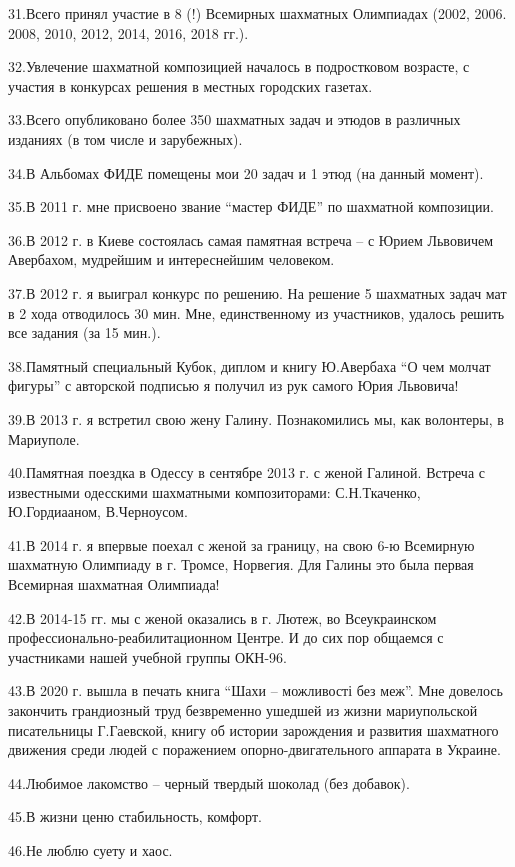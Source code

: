 31.Всего принял участие в 8 (!) Всемирных шахматных Олимпиадах (2002, 2006.
2008, 2010, 2012, 2014, 2016, 2018 гг.).

32.Увлечение шахматной композицией началось в подростковом возрасте, с участия
в конкурсах решения в местных городских газетах. 

33.Всего опубликовано более 350 шахматных задач и этюдов в различных изданиях
(в том числе и зарубежных).

34.В Альбомах ФИДЕ помещены мои 20 задач и 1 этюд (на данный момент). 

35.В 2011 г. мне присвоено звание \enquote{мастер ФИДЕ} по шахматной композиции. 

36.В 2012 г. в Киеве состоялась самая памятная встреча – с Юрием Львовичем
Авербахом, мудрейшим и интереснейшим человеком.

37.В 2012 г. я выиграл конкурс по решению. На решение 5 шахматных задач мат в 2
хода отводилось 30 мин. Мне, единственному из участников, удалось решить все
задания (за 15 мин.).

38.Памятный специальный Кубок, диплом и книгу Ю.Авербаха \enquote{О чем молчат фигуры}
с авторской подписью я получил из рук самого Юрия Львовича! 

39.В 2013 г. я встретил свою жену Галину. Познакомились мы, как волонтеры, в
Мариуполе. 

40.Памятная поездка в Одессу в сентябре 2013 г. с женой Галиной. Встреча с
известными одесскими шахматными композиторами: С.Н.Ткаченко, Ю.Гордиааном,
В.Черноусом. 

41.В 2014 г. я впервые поехал с женой за границу, на свою 6-ю Всемирную
шахматную Олимпиаду в г. Тромсе, Норвегия. Для Галины это была первая Всемирная
шахматная Олимпиада! 

42.В 2014-15 гг. мы с женой оказались в г. Лютеж, во Всеукраинском
профессионально-реабилитационном Центре. И до сих пор общаемся с участниками
нашей учебной группы ОКН-96. 

43.В 2020 г. вышла в печать книга \enquote{Шахи – можливості без меж}. Мне довелось
закончить грандиозный труд безвременно ушедшей из жизни мариупольской
писательницы Г.Гаевской, книгу об истории зарождения и развития шахматного
движения среди людей с поражением опорно-двигательного аппарата в Украине.  

44.Любимое лакомство – черный твердый шоколад (без добавок). 

45.В жизни ценю стабильность, комфорт.

46.Не люблю суету и хаос. 

